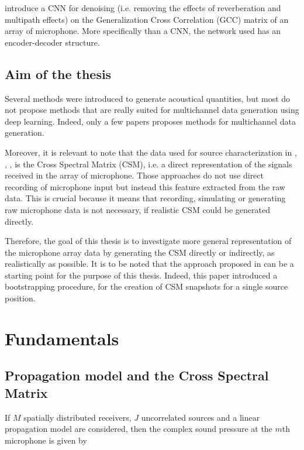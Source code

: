 \documentclass[11pt,a4paper,twoside]{report}
\begin{document}
\cite{vera2021acoustic} introduce a CNN for denoising (i.e. removing the effects of reverberation and multipath effects) on the Generalization Cross Correlation (GCC) matrix of an array of microphone. More specifically than a CNN, the network used has an encoder-decoder structure.

\section{Aim of the thesis}

Several methods were introduced to generate acoustical quantities, but most do not propose methods that are really suited for multichannel data generation using deep learning. Indeed, only a few papers proposes methods for multichannel data generation. 

Moreover, it is relevant to note that the data used for source characterization in \cite{castellini2021neural}, \cite{lee2021deep}, \cite{ma2019phased}, \cite{xu2021deep} is the Cross Spectral Matrix (CSM), i.e. a direct representation of the signals received in the array of microphone. Those approaches do not use direct recording of microphone input but instead this feature extracted from the raw data. This is crucial because it means that recording, simulating or generating raw microphone data is not necessary, if realistic CSM could be generated directly. 

Therefore, the goal of this thesis is to investigate more general representation of the microphone array data by generating the CSM directly or indirectly, as realistically as possible. It is to be noted that the approach proposed in \cite{gerstoft2020parametric} can be a starting point for the purpose of this thesis. Indeed, this paper introduced a bootstrapping procedure, for the creation of CSM snapshots for a single source position.

\chapter{Fundamentals}

\section{Propagation model and the Cross Spectral Matrix}

If $M$ spatially distributed receivers, $J$ uncorrelated sources and a linear propagation model are considered, then the complex sound pressure at the $m$th microphone is given by
\end{document}
